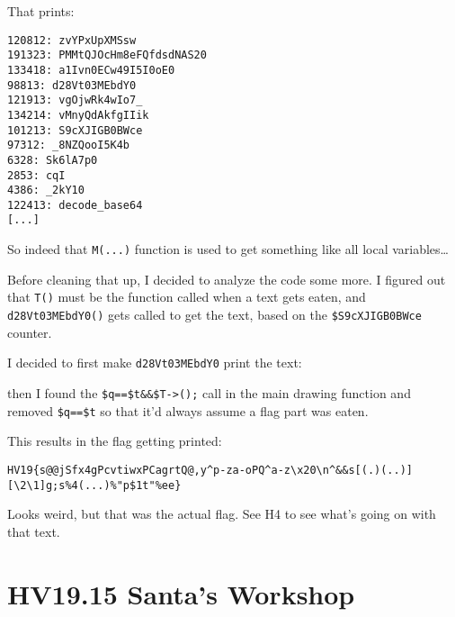 \documentclass[11pt]{article}
\newenvironment{Shaded}{}{}
\newcommand{\KeywordTok}[1]{\textcolor[rgb]{0.00,0.44,0.13}{\textbf{{#1}}}}
\newcommand{\DataTypeTok}[1]{\textcolor[rgb]{0.56,0.13,0.00}{{#1}}}
\newcommand{\BaseNTok}[1]{\textcolor[rgb]{0.25,0.63,0.44}{{#1}}}
\newcommand{\StringTok}[1]{\textcolor[rgb]{0.25,0.44,0.63}{{#1}}}
\newcommand{\FunctionTok}[1]{\textcolor[rgb]{0.02,0.16,0.49}{{#1}}}
\newcommand{\NormalTok}[1]{{#1}}
\begin{document}
That prints:

\begin{verbatim}
120812: zvYPxUpXMSsw
191323: PMMtQJOcHm8eFQfdsdNAS20
133418: a1Ivn0ECw49I5I0oE0
98813: d28Vt03MEbdY0
121913: vgOjwRk4wIo7_
134214: vMnyQdAkfgIIik
101213: S9cXJIGB0BWce
97312: _8NZQooI5K4b
6328: Sk6lA7p0
2853: cqI
4386: _2kY10
122413: decode_base64
[...]
\end{verbatim}

So indeed that \texttt{M(...)} function is used to get something like
all local variables\ldots{}

Before cleaning that up, I decided to analyze the code some more. I
figured out that \texttt{T()} must be the function called when a text
gets eaten, and \texttt{d28Vt03MEbdY0()} gets called to get the text,
based on the \texttt{\$S9cXJIGB0BWce} counter.

I decided to first make \texttt{d28Vt03MEbdY0} print the text:

\begin{Shaded}
\end{Shaded}

then I found the \texttt{\$q==\$t\&\&\$T-\textgreater{}();} call in the
main drawing function and removed \texttt{\$q==\$t} so that it'd always
assume a flag part was eaten.

This results in the flag getting printed:

\begin{verbatim}
HV19{s@@jSfx4gPcvtiwxPCagrtQ@,y^p-za-oPQ^a-z\x20\n^&&s[(.)(..)][\2\1]g;s%4(...)%"p$1t"%ee}
\end{verbatim}

Looks weird, but that was the actual flag. See H4 to see what's going on
with that text.


    
\pagebreak{}
    \hypertarget{hv19.15-santas-workshop}{%
\section{HV19.15 Santa's Workshop}\label{hv19.15-santas-workshop}}
\end{document}
